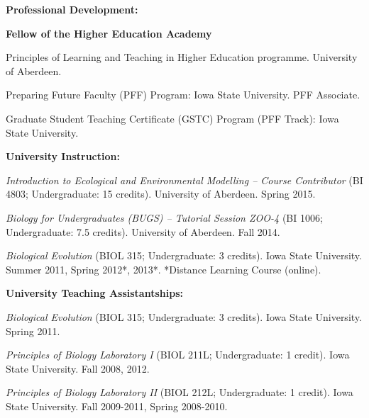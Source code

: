 \documentclass[letterpaper]{article}
\renewenvironment{itemize}{
  \begin{list}{}{
    \setlength{\leftmargin}{1.5em}
  }
}{
  \end{list}
}
\begin{document}
\begin{itemize}
\item {\bf Professional Development:}
\begin{itemize}
\item[$\bullet$]{{\bf Fellow of the Higher Education Academy}}
\item[$\bullet$]{Principles of Learning and Teaching in Higher Education programme. University of Aberdeen.}
\item[$\bullet$]{Preparing Future Faculty (PFF) Program: Iowa State University. PFF Associate.}
\item[$\bullet$]{Graduate Student Teaching Certificate (GSTC) Program (PFF Track): Iowa State University.}
\end{itemize}

\item {\bf University Instruction:}
\begin{itemize}
\item[$\bullet$]{{\it Introduction to Ecological and Environmental Modelling -- Course Contributor} (BI 4803; Undergraduate: 15 credits). University of Aberdeen. Spring 2015.}
\item[$\bullet$]{{\it Biology for Undergraduates (BUGS) -- Tutorial Session ZOO-4} (BI 1006; Undergraduate: 7.5 credits). University of Aberdeen. Fall 2014.}
\item[$\bullet$]{{\it Biological Evolution} (BIOL 315; Undergraduate: 3 credits). Iowa State University. Summer 2011, Spring 2012*, 2013*. *Distance Learning Course (online).}
\end{itemize}

\item {\bf University Teaching Assistantships:}
\begin{itemize}
\item[$\bullet$]{{\it Biological Evolution} (BIOL 315; Undergraduate: 3 credits). Iowa State University. Spring 2011.}
\item[$\bullet$]{{\it Principles of Biology Laboratory I} (BIOL 211L; Undergraduate: 1 credit). Iowa State University. Fall 2008, 2012.}
\item[$\bullet$]{{\it Principles of Biology Laboratory II} (BIOL 212L; Undergraduate: 1 credit). Iowa State University. Fall 2009-2011, Spring 2008-2010.}
\end{itemize}

\end{itemize}
\end{document}
